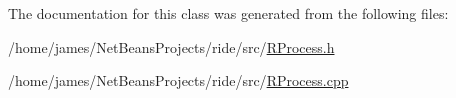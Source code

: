 The documentation for this class was generated from the following files\-:\begin{DoxyCompactItemize}
\item 
/home/james/\-Net\-Beans\-Projects/ride/src/\hyperlink{_r_process_8h}{R\-Process.\-h}\item 
/home/james/\-Net\-Beans\-Projects/ride/src/\hyperlink{_r_process_8cpp}{R\-Process.\-cpp}\end{DoxyCompactItemize}
